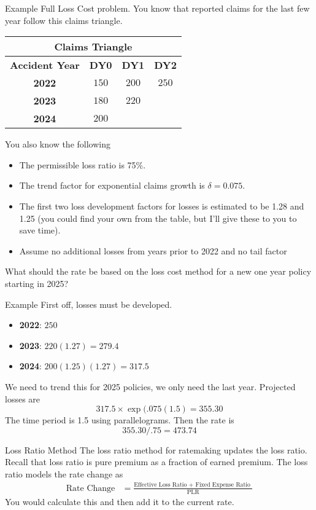 \documentclass[compress,mathserif]{beamer}
\begin{document}
\begin{frame}{Example}
Full Loss Cost problem. You know that reported claims for the last few year follow this claims triangle. 
\begin{table}[htbp]
    \centering
    \begin{tabular}{|c|c|c|c|}
    \hline
    \multicolumn{4}{|c|}{\textbf{Claims Triangle}} \\ \hline
    \textbf{Accident Year} & \textbf{DY0} & \textbf{DY1} & \textbf{DY2} \\ \hline
    \textbf{2022} & $150$ & $200$ & $250$ \\ \hline
    \textbf{2023} & $180$ & $220$ &  \\ \hline
    \textbf{2024} & $200$ & &  \\ \hline
    \end{tabular}
\end{table}
You also know the following
\begin{itemize}
\item The permissible loss ratio is 75\%. 
\item The trend factor for exponential claims growth is $\delta = 0.075$. 
\item The first two loss development factors for losses is estimated to be 1.28 and 1.25 (you could find your own from the table, but I'll give these to you to save time). 
\item Assume no additional losses from years prior to 2022 and no tail factor
\end{itemize}
What should the rate be based on the loss cost method for a new one year policy starting in 2025?

\end{frame}

\begin{frame}{Example}
First off, losses must be developed. 
\begin{itemize}
\item \textbf{2022}: $250$
\item \textbf{2023}: $220 (1.27) = 279.4$
\item \textbf{2024}: $200 (1.25)(1.27) = 317.5$
\end{itemize} 
We need to trend this for 2025 policies, we only need the last year. Projected losses are \[317.5 \times \exp{(.075 (1.5)} = 355.30\] The time period is 1.5 using parallelograms. Then the rate is \[355.30/.75 = 473.74\]
\end{frame}

\begin{frame}{Loss Ratio Method}
The loss ratio method for ratemaking updates the loss ratio. Recall that loss ratio is pure premium as a fraction of earned premium. The loss ratio models the rate change as
         \begin{align*}
                \text{Rate Change} &= \frac{\text{Effective Loss Ratio + Fixed Expense Ratio }} {\text{PLR}} 
            \end{align*}
    You would calculate this and then add it to the current rate. 
\end{frame}
\end{document}
